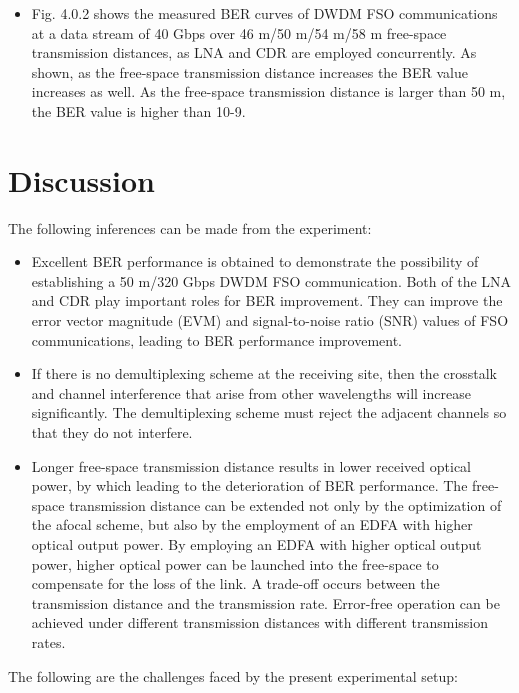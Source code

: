\documentclass[hidelinks, 12pt]{report}
\begin{document}
\begin{itemize}
\begin{figure}[H]
{concurrently. }
\label{Measured BER curves of DWDM FSO communication at a data stream of 40 Gb/s  over
46-m/50-m/54-m/58-m free-space transmission distances as LNA and CDR are employed
concurrently. }
\end{figure}
\item Fig. 4.0.2 shows the measured BER curves of DWDM FSO communications at a data stream of
40 Gbps  over 46 m/50 m/54 m/58 m free-space transmission distances, as LNA and CDR
are employed concurrently. As shown, as the free-space transmission distance increases the
BER value increases as well. As the free-space transmission distance is larger than 50 m, the
BER value is higher than 10-9.
\end{itemize}

\section{Discussion}
The following inferences can be made from the experiment:
\begin{itemize}
    \item Excellent BER performance is obtained to demonstrate the possibility of establishing a
50 m/320 Gbps DWDM FSO communication. Both of the LNA and CDR play important roles for BER improvement.
They can improve the error vector magnitude (EVM) and signal-to-noise ratio (SNR) values of
FSO communications, leading to BER performance improvement.
\item If there
is no demultiplexing scheme at the receiving site, then the crosstalk and channel interference
that arise from other wavelengths will increase significantly. The
demultiplexing scheme must reject the adjacent channels so that they do not interfere. 
\item Longer free-space transmission distance results in lower received
optical power, by which leading to the deterioration of BER performance. The free-space
transmission distance can be extended not only by the optimization of the afocal scheme, but
also by the employment of an EDFA with higher optical output power. By employing an EDFA
with higher optical output power, higher optical power can be launched into the free-space to
compensate for the loss of the link. A trade-off occurs between the transmission distance and
the transmission rate. Error-free operation can be achieved under different transmission distances
with different transmission rates.
\end{itemize}
The following are the challenges faced by the present experimental setup:
\end{document}
